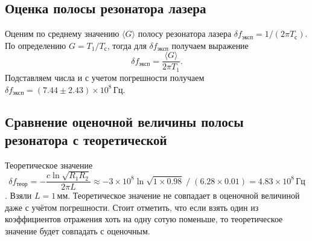 \documentclass[12pt]{article}
\begin{document}
	\subsection{Оценка полосы резонатора лазера}

	Оценим по среднему значению $\langle G \rangle$ полосу резонатора лазера $\delta f_\text{эксп} = 1/(2\pi T_\text{с})$. По определению $G = T_1 / T_\text{с}$, тогда для $\delta f_\text{эксп}$ получаем выражение
	\begin{equation}
		\delta f_\text{эксп} = \frac{\langle G \rangle}{2\pi T_1}.
	\end{equation}
	Подставляем числа и с учетом погрешности получаем $\delta f_\text{эксп} = (7.44\pm2.43)\times10^8\,\text{Гц}$.

	\subsection{Сравнение оценочной величины полосы резонатора с теоретической}
	Теоретическое значение $$\delta f_\text{теор} = -\frac{c \ln{\sqrt{R_1 R_2}}}{2\pi L} \approx - 3\times10^8 \ln{\sqrt{1\times 0.98}}\; /\;(6.28 \times 0.01) = 4.83\times10^8\,\text{Гц}$$. Взяли $L=1\,\text{мм}$. Теоретическое значение не совпадает в оценочной величиной даже с учётом погрешности. Стоит отметить, что если взять один из коэффициентов отражения хоть на одну сотую поменьше, то теоретическое значение будет совпадать с оценочным.
\end{document}
